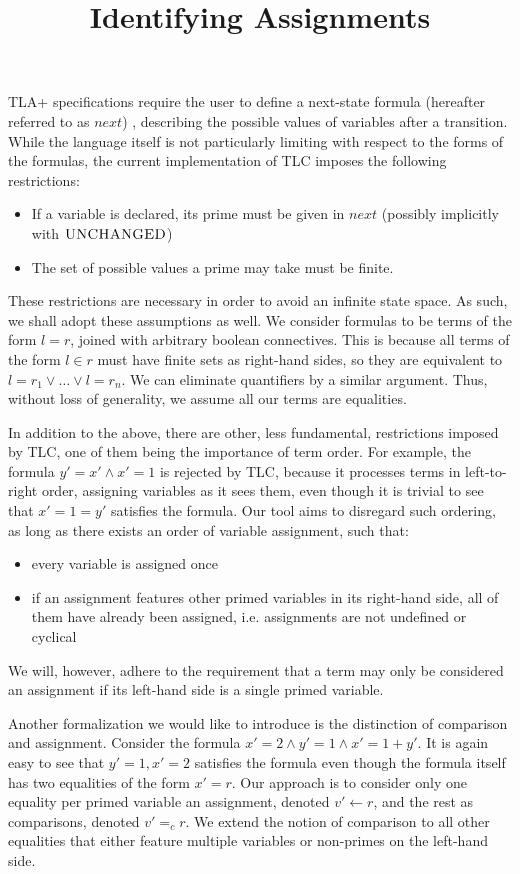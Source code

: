 \documentclass[a4paper, 12pt]{article}
\title{Identifying Assignments}
\date{}
\begin{document}
\maketitle

TLA+ specifications require the user to define a next-state formula (hereafter referred to as $next$) , describing the possible values of variables after a transition. 
While the language itself is not particularly limiting with respect to the forms of the formulas, the current implementation of TLC imposes the following restrictions:
\begin{itemize}
\item If a variable is declared, its prime must be given in $next$ (possibly implicitly with $\textsc{UNCHANGED}$)
\item The set of possible values a prime may take must be finite.
\end{itemize}

These restrictions are necessary in order to avoid an infinite state space. As such, we shall adopt these assumptions as well.
We consider formulas to be terms of the form $l = r$, joined with arbitrary boolean connectives. 
This is because all terms of the form $l \in r$ must have finite sets as right-hand sides, so they are equivalent to $l = r_1 \vee \dots \vee l = r_n$. We can eliminate quantifiers by a similar argument. Thus, without loss of generality, we assume all our terms are equalities.

In addition to the above, there are other, less fundamental, restrictions imposed by TLC, one of them being the importance of term order. For example, the formula $y' = x' \wedge x'=1$ is rejected by TLC, because it processes terms in left-to-right order, assigning variables as it sees them, even though it is trivial to see that $x' = 1 = y'$ satisfies the formula. Our tool aims to disregard such ordering, as long as there exists an order of variable assignment, such that:
\begin{itemize}
\item every variable is assigned once
\item if an assignment features other primed variables in its right-hand side, all of them have already been assigned, i.e. assignments are not undefined or cyclical
\end{itemize}
We will, however, adhere to the requirement that a term may only be considered an assignment if its left-hand side is a single primed variable.

Another formalization we would like to introduce is the distinction of comparison and assignment. Consider the formula $x' = 2 \wedge y' = 1 \wedge x' = 1 + y'$. It is again easy to see that $y'=1, x' = 2$ satisfies the formula even though the formula itself has two equalities of the form $x' = r$. Our approach is to consider only one equality per primed variable an assignment, denoted $v' \leftarrow r$, and the rest as comparisons, denoted $v' =_c r$. We extend the notion of comparison to all other equalities that either feature multiple variables or non-primes on the left-hand side.
\end{document}
